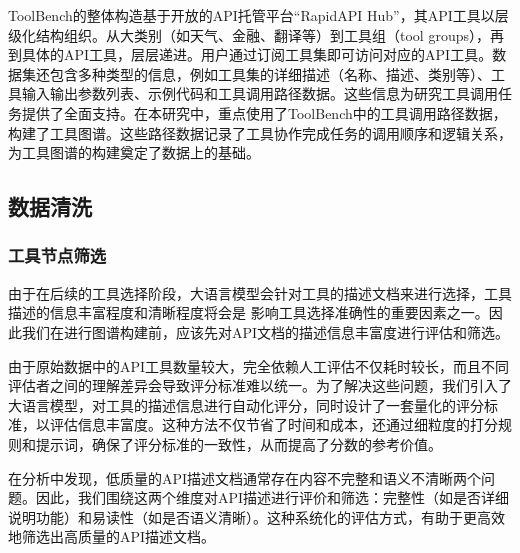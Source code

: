 ToolBench的整体构造基于开放的API托管平台“RapidAPI Hub”，其API工具以层级化结构组织。从大类别（如天气、金融、翻译等）到工具组（tool groups），再到具体的API工具，层层递进。用户通过订阅工具集即可访问对应的API工具。数据集还包含多种类型的信息，例如工具集的详细描述（名称、描述、类别等）、工具输入输出参数列表、示例代码和工具调用路径数据。这些信息为研究工具调用任务提供了全面支持。在本研究中，重点使用了ToolBench中的工具调用路径数据，构建了工具图谱。这些路径数据记录了工具协作完成任务的调用顺序和逻辑关系，为工具图谱的构建奠定了数据上的基础。


\subsection{数据清洗}

\subsubsection{工具节点筛选}


由于在后续的工具选择阶段，大语言模型会针对工具的描述文档来进行选择，工具描述的信息丰富程度和清晰程度将会是
影响工具选择准确性的重要因素之一。因此我们在进行图谱构建前，应该先对API文档的描述信息丰富度进行评估和筛选。

由于原始数据中的API工具数量较大，完全依赖人工评估不仅耗时较长，而且不同评估者之间的理解差异会导致评分标准难以统一。为了解决这些问题，我们引入了大语言模型，对工具的描述信息进行自动化评分，同时设计了一套量化的评分标准，以评估信息丰富度。这种方法不仅节省了时间和成本，还通过细粒度的打分规则和提示词，确保了评分标准的一致性，从而提高了分数的参考价值。

在分析中发现，低质量的API描述文档通常存在内容不完整和语义不清晰两个问题。因此，我们围绕这两个维度对API描述进行评价和筛选：完整性（如是否详细说明功能）和易读性（如是否语义清晰）。这种系统化的评估方式，有助于更高效地筛选出高质量的API描述文档。

